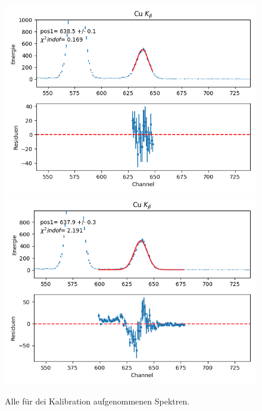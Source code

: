 \documentclass[12pt,a4paper]{article}
\begin{document}
\begin{figure}[H]
\centering
\includegraphics[scale=0.8]{Bilder/alpha/cu_beta_1.png}
\includegraphics[scale=0.8]{Bilder/alpha/cu_beta_2.png}
\caption{Alle für dei Kalibration aufgenommenen Spektren.}
\label{fig:kal_alles}
\end{figure}
\end{document}
